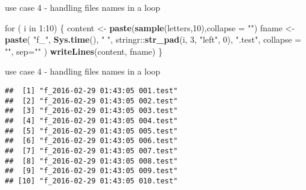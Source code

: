 \documentclass[ignorenonframetext,]{beamer}
\newenvironment{Shaded}{\begin{snugshade}}{\end{snugshade}}
\newcommand{\KeywordTok}[1]{\textcolor[rgb]{0.13,0.29,0.53}{\textbf{{#1}}}}
\newcommand{\DataTypeTok}[1]{\textcolor[rgb]{0.13,0.29,0.53}{{#1}}}
\newcommand{\DecValTok}[1]{\textcolor[rgb]{0.00,0.00,0.81}{{#1}}}
\newcommand{\CharTok}[1]{\textcolor[rgb]{0.31,0.60,0.02}{{#1}}}
\newcommand{\StringTok}[1]{\textcolor[rgb]{0.31,0.60,0.02}{{#1}}}
\newcommand{\NormalTok}[1]{{#1}}
\begin{document}
\begin{frame}[fragile]{use case 4 - handling files names in a loop}

\begin{Shaded}
\begin{Highlighting}[]
\NormalTok{for ( i in }\DecValTok{1}\NormalTok{:}\DecValTok{10}\NormalTok{) \{}
  \NormalTok{content <-}\StringTok{ }\KeywordTok{paste}\NormalTok{(}\KeywordTok{sample}\NormalTok{(letters,}\DecValTok{10}\NormalTok{),}\DataTypeTok{collapse =} \StringTok{""}\NormalTok{)}
  \NormalTok{fname   <-}\StringTok{ }
\StringTok{    }\KeywordTok{paste}\NormalTok{(}
      \StringTok{"f_"}\NormalTok{, }
      \KeywordTok{Sys.time}\NormalTok{(), }\StringTok{" "}\NormalTok{, }
      \NormalTok{stringr::}\KeywordTok{str_pad}\NormalTok{(i, }\DecValTok{3}\NormalTok{, }\StringTok{"left"}\NormalTok{, }\DecValTok{0}\NormalTok{),  }
      \StringTok{".test"}\NormalTok{,}
      \DataTypeTok{collapse =} \StringTok{""}\NormalTok{, }\DataTypeTok{sep=}\StringTok{""}
    \NormalTok{)}
  \KeywordTok{writeLines}\NormalTok{(content, fname)}
\NormalTok{\}}
\end{Highlighting}
\end{Shaded}

\end{frame}

\begin{frame}[fragile]{use case 4 - handling files names in a loop}

\begin{Shaded}
\end{Shaded}

\begin{verbatim}
##  [1] "f_2016-02-29 01:43:05 001.test"
##  [2] "f_2016-02-29 01:43:05 002.test"
##  [3] "f_2016-02-29 01:43:05 003.test"
##  [4] "f_2016-02-29 01:43:05 004.test"
##  [5] "f_2016-02-29 01:43:05 005.test"
##  [6] "f_2016-02-29 01:43:05 006.test"
##  [7] "f_2016-02-29 01:43:05 007.test"
##  [8] "f_2016-02-29 01:43:05 008.test"
##  [9] "f_2016-02-29 01:43:05 009.test"
## [10] "f_2016-02-29 01:43:05 010.test"
\end{verbatim}

\end{frame}
\end{document}
